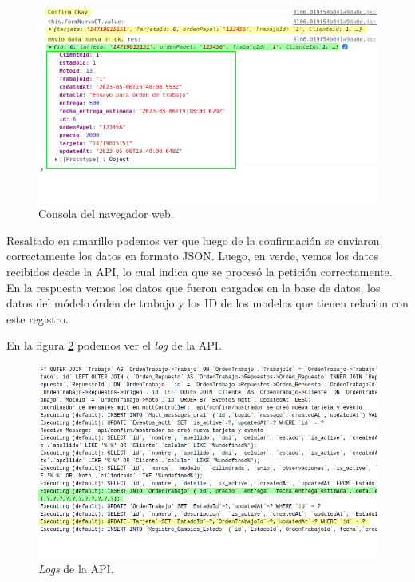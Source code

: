 \begin{figure}[H]
	\centering
	\includegraphics[width=\textwidth]{./Figures/ensayo-1/10.nueva-res.png}
	\caption{Consola del navegador web.}
	\label{fig:ensayonueva10}
\end{figure}

Resaltado en amarillo podemos ver que luego de la confirmación se enviaron correctamente los datos en formato JSON. Luego, en verde, vemos los datos recibidos desde la API, lo cual indica que se procesó la petición correctamente. En la respuesta vemos los datos que fueron cargados en la base de datos, los datos del módelo órden de trabajo y los ID de los modelos que tienen relacion con este registro.

En la figura \ref{fig:ensayonueva10-2} podemos ver el \textit{log} de la API.

\begin{figure}[H]
	\centering
	\includegraphics[width=\textwidth]{./Figures/ensayo-1/10.nueva-api-log.png}
	\caption{\textit{Logs} de la API.}
	\label{fig:ensayonueva10-2}
\end{figure}

